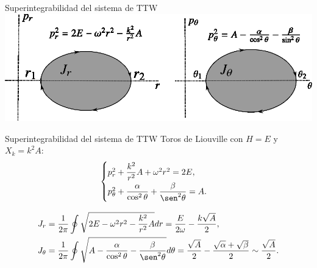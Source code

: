 \documentclass[aspectratio=169,mathserif]{beamer}
\begin{document}
  \begin{frame}{Superintegrabilidad del sistema de TTW}
    \centering
    \includegraphics[width=\textwidth]{ciclos} 
  \end{frame}

  \begin{frame}{Superintegrabilidad del sistema de TTW}
    Toros de Liouville con $H=E$ y $X_k=k^2 A$:
    \begin{equation*}
      \begin{cases}
	p_r^2 + \dfrac{k^2}{r^2}A + \omega^2 r^2 = 2E, \\[5 pt]
	p_\theta^2 + \dfrac{\alpha}{\cos^2 \theta}+ \dfrac{\beta}{\sen^2 \theta} = A.
      \end{cases}
    \end{equation*}

    \begin{align*}
      J_r&=\frac{1}{2\pi} \oint \sqrt{2E-\omega^2 r^2 - \frac{k^2}{r^2}A} dr = \frac{E}{2\omega}- \frac{k\sqrt{A}}{2}, \\
      J_\theta&= \frac{1}{2\pi} \oint \sqrt{A-\frac{\alpha}{\cos^2 \theta}-\frac{\beta}{\sen^2 \theta}}d\theta = \frac{\sqrt{A}}{2}- \frac{\sqrt{\alpha}+\sqrt{\beta}}{2}\sim \frac{\sqrt{A}}{2}.
    \end{align*}
    
  \end{frame}
\end{document}
